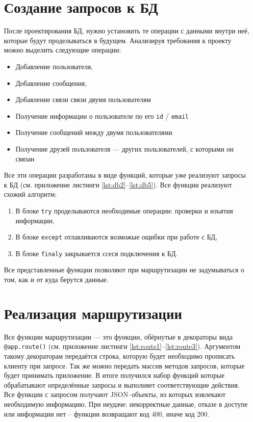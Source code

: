 \documentclass[14pt,final]{report}
\begin{document}
\section{Создание запросов к БД}
После проектирования БД, нужно установить те операции с данными внутри неё, которые будут проделываться в будущем. Анализируя требования к проекту можно выделить следующие операции:
\begin{itemize}
    \item Добавление пользователя,
    \item Добавление сообщения,
    \item Добавление связи связи двумя пользователям
    \item Получение информации о пользователе по его \texttt{id} / \texttt{email}
    \item Получение сообщений между двумя пользователями
    \item Получение друзей пользователя --- других пользователей, с которыми он связан
\end{itemize}
Все эти операции разработаны в виде функций, которые уже реализуют запросы к БД (см. приложение листинги \ref{lst:db2}--\ref{lst:db5}). Все функции реализуют схожий алгоритм: 
\begin{enumerate}
    \item В блоке \texttt{try} проделываются необходимые операции: проверки и изъятия информации,
    \item В блоке \texttt{except} отлавливаются возможые ощибки при работе с БД,
    \item В блоке \texttt{finaly} закрывается ссеся подключения к БД.
\end{enumerate}
Все представленные функции позволяют при маршрутизации не задумываться о том, как и от куда берутся данные.

\section{Реализация маршрутизации}
Все функции маршрутизации --- это функции, обёрнутые в декораторы вида \texttt{@app.route()} (см. приложение листинги \ref{lst:route1}--\ref{lst:route3}). Аргументом такому декораторам передаётся строка, которую будет необходимо прописать клиенту при запросе. Так же можно передать массив методов запросов, которые будет принимать приложение. В итоге получился набор функций которые обрабатывают определённые запросы и выполняет соответствующие действия. Все функции с запросом получают JSON--объекты, из которых извлекают необходимую информацию. При неудаче: некорректные данные, отказе в доступе или информации нет -- функции возвращают код 400, иначе код 200.
\end{document}
